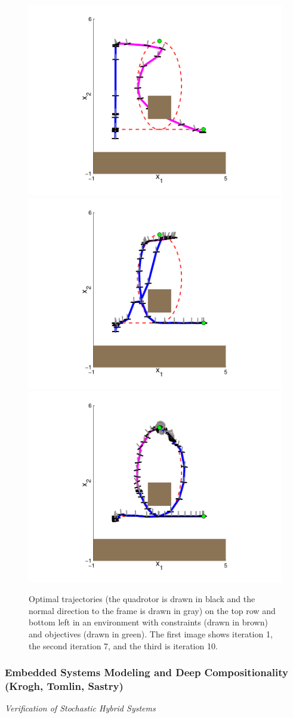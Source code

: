 \begin{figure}[!t]
  \begin{minipage}{\columnwidth}
    \includegraphics[clip, trim = 3.25cm .75cm 3.25cm .75cm, width = .32\columnwidth, keepaspectratio = true]{img/starmac_wp2_iter1}
    \includegraphics[clip, trim = 3.25cm .75cm 3.25cm .75cm, width = .32\columnwidth, keepaspectratio = true]{img/starmac_wp2_iter7}
    \includegraphics[clip, trim = 3.25cm .75cm 3.25cm .75cm, width = .32\columnwidth, keepaspectratio = true]{img/starmac_wp2_iter10}
  \end{minipage}
  \caption{Optimal trajectories (the quadrotor is drawn in black and the normal direction to the frame is drawn in gray) on the top row and bottom left in an environment with constraints (drawn in brown) and objectives (drawn in green). The first image shows iteration 1, the second iteration 7, and the third is iteration 10.}
  \label{fig:starmacexample}
\end{figure}


\subsubsection{Embedded Systems Modeling and Deep Compositionality (Krogh, Tomlin, Sastry)}
                 
                 \emph{Verification of Stochastic Hybrid Systems}

